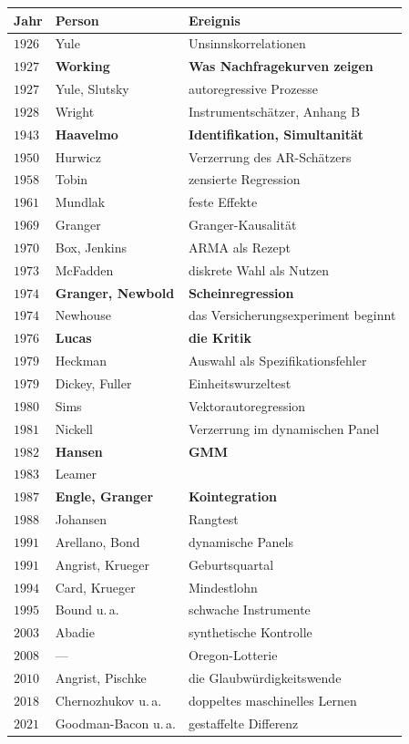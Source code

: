 \begin{merksatz}
\begin{center}
{\small
\renewcommand{\arraystretch}{1.32}
\begin{tabular}{@{}P{1.3cm}P{3.0cm}P{4.0cm}@{}}
\toprule
\textbf{Jahr} & \textbf{Person} & \textbf{Ereignis}\\
\midrule
$1926$ & Yule & Unsinnskorrelationen\\
$1927$ & \textbf{Working} & \textbf{Was Nachfragekurven zeigen}\\
$1927$ & Yule, Slutsky & autoregressive Prozesse\\
$1928$ & Wright & Instrumentschätzer, Anhang B\\
$1943$ & \textbf{Haavelmo} & \textbf{Identifikation, Simultanität}\\
$1950$ & Hurwicz & Verzerrung des AR-Schätzers\\
$1958$ & Tobin & zensierte Regression\\
$1961$ & Mundlak & feste Effekte\\
$1969$ & Granger & Granger-Kausalität\\
$1970$ & Box, Jenkins & ARMA als Rezept\\
$1973$ & McFadden & diskrete Wahl als Nutzen\\
$1974$ & \textbf{Granger, Newbold} & \textbf{Scheinregression}\\
$1974$ & Newhouse & das Versicherungsexperiment beginnt\\
$1976$ & \textbf{Lucas} & \textbf{die Kritik}\\
$1979$ & Heckman & Auswahl als Spezifikationsfehler\\
$1979$ & Dickey, Fuller & Einheitswurzeltest\\
$1980$ & Sims & Vektorautoregression\\
$1981$ & Nickell & Verzerrung im dynamischen Panel\\
$1982$ & \textbf{Hansen} & \textbf{GMM}\\
$1983$ & Leamer & \\
$1987$ & \textbf{Engle, Granger} & \textbf{Kointegration}\\
$1988$ & Johansen & Rangtest\\
$1991$ & Arellano, Bond & dynamische Panels\\
$1991$ & Angrist, Krueger & Geburtsquartal\\
$1994$ & Card, Krueger & Mindestlohn\\
$1995$ & Bound u.\,a. & schwache Instrumente\\
$2003$ & Abadie & synthetische Kontrolle\\
$2008$ & --- & Oregon-Lotterie\\
$2010$ & Angrist, Pischke & die Glaubwürdigkeits\-wende\\
$2018$ & Chernozhukov u.\,a. & doppeltes maschinelles Lernen\\
$2021$ & Goodman-Bacon u.\,a. & gestaffelte Differenz\\
\bottomrule
\end{tabular}}
\end{center}
\end{merksatz}


